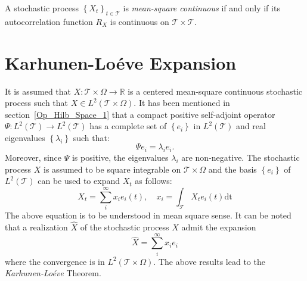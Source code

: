 \begin{lemma}
A stochastic process $\left\{X_t\right\}_{t \in \mathcal{T}}$ is \textit{mean-square continuous} if and only if its autocorrelation function $R_X$ is continuous on $\mathcal{T} \times \mathcal{T}$.
\end{lemma}

\section{Karhunen-Lo\'{e}ve Expansion}
It is assumed that $X: \mathcal{T} \times \Omega \rightarrow \mathbb{R}$ is a centered mean-square continuous stochastic process such that $X \in L^2\left(\mathcal{T} \times \Omega\right)$. 
It has been mentioned in section~\ref{Op_Hilb_Space_1} that a compact positive self-adjoint operator $\Psi: L^2(\mathcal{T}) \rightarrow  L^2(\mathcal{T})$ has a complete set of $\left\{e_i\right\}$ in $ L^2(\mathcal{T})$ and real eigenvalues $\left\{\lambda_i\right\}$ such that:
\begin{equation}
\Psi e_i = \lambda_i e_i.
\end{equation}
Moreover, since $\Psi$ is positive, the eigenvalues $\lambda_i$ are non-negative. The stochastic process $X$ is assumed to be square integrable on $\mathcal{T} \times \Omega$ and the basis $\left\{e_i\right\}$ of $L^2(\mathcal{T})$ can be used to expand $X_t$ as follows:
\begin{equation}
X_t = \sum_{i}^{\infty} x_i e_i(t), \quad x_i = \int_{\mathcal{T}} X_t e_i(t)\mathrm{dt}
\end{equation}
The above equation is to be understood in mean square sense. It can be noted that a realization $\hat{X}$ of the stochastic process $X$ admit the expansion
\begin{equation*}
\hat{X} = \sum_{i}^{\infty} x_i e_i
\end{equation*}
where the convergence is in $L^2\left(\mathcal{T} \times \Omega \right)$. The above results lead to the \textit{Karhunen-Lo\'{e}ve} Theorem.
